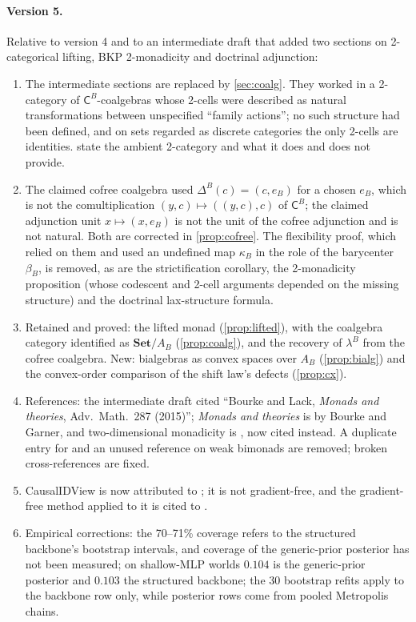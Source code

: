 \documentclass[11pt]{article}
\theoremstyle{definition}
\theoremstyle{remark}
\newcommand{\Set}{\mathbf{Set}}
\newcommand{\C}{\mathsf{C}}
\begin{document}
\paragraph{Version 5.} Relative to version 4 and to an intermediate draft that added two
sections on 2-categorical lifting, BKP 2-monadicity and doctrinal adjunction:
\begin{enumerate}[leftmargin=*,label=(\alph*)]
\item The intermediate sections are replaced by \cref{sec:coalg}. They worked in a 2-category of
  $\C^B$-coalgebras whose 2-cells were described as natural transformations between unspecified
  ``family actions''; no such structure had been defined, and on sets regarded as discrete categories
  the only 2-cells are identities.  state the ambient 2-category and what it
  does and does not provide.
\item The claimed cofree coalgebra used $\Delta^B(c)=(c,e_B)$ for a chosen $e_B$, which is not the
  comultiplication $(y,c)\mapsto((y,c),c)$ of $\C^B$; the claimed adjunction unit $x\mapsto(x,e_B)$ is
  not the unit of the cofree adjunction and is not natural. Both are corrected in
  \cref{prop:cofree}. The flexibility proof, which relied on them and used an undefined map $\kappa_B$
  in the role of the barycenter $\beta_B$, is removed, as are the strictification corollary, the
  2-monadicity proposition (whose codescent and 2-cell arguments depended on the missing structure)
  and the doctrinal lax-structure formula.
\item Retained and proved: the lifted monad (\cref{prop:lifted}), with the coalgebra category
  identified as $\Set/A_B$ (\cref{prop:coalg}), and the recovery of $\lambda^B$ from the cofree
  coalgebra. New: bialgebras as convex spaces over $A_B$ (\cref{prop:bialg}) and the convex-order
  comparison of the shift law's defects (\cref{prop:cx}).
\item References: the intermediate draft cited ``Bourke and Lack, \emph{Monads and theories}, Adv.\
  Math.\ 287 (2015)''; \emph{Monads and theories} is by Bourke and Garner, and two-dimensional
  monadicity is \cite{Bourke2014}, now cited instead. A duplicate entry for \cite{Street1972} and an
  unused reference on weak bimonads are removed; broken cross-references are fixed.
\item CausalIDView is now attributed to \cite{Jung2026}; it is not gradient-free, and the
  gradient-free method applied to it is cited to \cite[Section~51]{Awasthi-ThreeLayers}.
\item Empirical corrections: the 70--71\% coverage refers to the structured backbone's bootstrap
  intervals, and coverage of the generic-prior posterior has not been measured; on shallow-MLP worlds
  $0.104$ is the generic-prior posterior and $0.103$ the structured backbone; the 30 bootstrap refits
  apply to the backbone row only, while posterior rows come from pooled Metropolis chains.
\end{enumerate}
\end{document}
